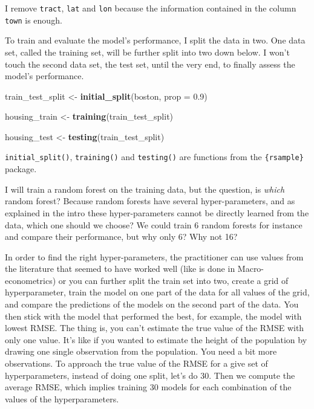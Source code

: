 \documentclass[]{gitbook}
\newenvironment{Shaded}{\begin{snugshade}}{\end{snugshade}}
\newcommand{\DataTypeTok}[1]{\textcolor[rgb]{0.13,0.29,0.53}{#1}}
\newcommand{\FloatTok}[1]{\textcolor[rgb]{0.00,0.00,0.81}{#1}}
\newcommand{\KeywordTok}[1]{\textcolor[rgb]{0.13,0.29,0.53}{\textbf{#1}}}
\newcommand{\NormalTok}[1]{#1}
\newcommand{\StringTok}[1]{\textcolor[rgb]{0.31,0.60,0.02}{#1}}
\begin{document}
I remove \texttt{tract}, \texttt{lat} and \texttt{lon} because the information contained in the column \texttt{town} is enough.

To train and evaluate the model's performance, I split the data in two.
One data set, called the training set, will be further split into two down below. I won't
touch the second data set, the test set, until the very end, to finally assess the model's
performance.

\begin{Shaded}
\begin{Highlighting}[]
\NormalTok{train_test_split <-}\StringTok{ }\KeywordTok{initial_split}\NormalTok{(boston, }\DataTypeTok{prop =} \FloatTok{0.9}\NormalTok{)}

\NormalTok{housing_train <-}\StringTok{ }\KeywordTok{training}\NormalTok{(train_test_split)}

\NormalTok{housing_test <-}\StringTok{ }\KeywordTok{testing}\NormalTok{(train_test_split)}
\end{Highlighting}
\end{Shaded}

\texttt{initial\_split()}, \texttt{training()} and \texttt{testing()} are functions from the \texttt{\{rsample\}} package.

I will train a random forest on the training data, but the question, is \emph{which} random forest?
Because random forests have several hyper-parameters, and as explained in the intro these
hyper-parameters cannot be directly learned from the data, which one should we choose? We could
train 6 random forests for instance and compare their performance, but why only 6? Why not 16?

In order to find the right hyper-parameters, the practitioner can
use values from the literature that seemed to have worked well (like is done in Macro-econometrics)
or you can further split the train set into two, create a grid of hyperparameter, train the model
on one part of the data for all values of the grid, and compare the predictions of the models on the
second part of the data. You then stick with the model that performed the best, for example, the
model with lowest RMSE. The thing is, you can't estimate the true value of the RMSE with only
one value. It's like if you wanted to estimate the height of the population by drawing one single
observation from the population. You need a bit more observations. To approach the true value of the
RMSE for a give set of hyperparameters, instead of doing one split, let's do 30. Then we
compute the average RMSE, which implies training 30 models for each combination of the values of the
hyperparameters.
\end{document}
